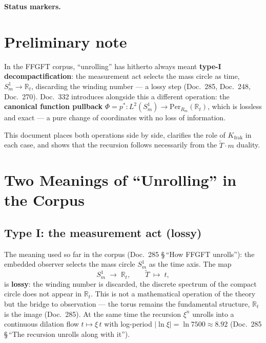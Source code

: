 
\medskip\noindent\textbf{Status markers.}


\section*{Preliminary note}

In the FFGFT corpus, ``unrolling'' has hitherto always meant
\textbf{type-I decompactification}: the measurement act selects the
mass circle as time, $S^1_m\to\mathbb{R}_t$, discarding the winding
number — a lossy step (Doc.~285, Doc.~248, Doc.~270).
Doc.~332 introduces alongside this a different operation: the
\textbf{canonical function pullback}
$\Phi=p^*:L^2(S^1_m)\to\mathrm{Per}_{R_m}(\mathbb{R}_t)$, which is
lossless and exact — a pure change of coordinates with no loss of
information.

This document places both operations side by side, clarifies the role
of $K_{\text{frak}}$ in each case, and shows that the recursion
follows necessarily from the $\tilde{T}\cdot m$ duality.

\section{Two Meanings of ``Unrolling'' in the Corpus}

\subsection{Type I: the measurement act (lossy)}

The meaning used so far in the corpus (Doc.~285 §\,``How FFGFT
unrolls''): the embedded observer selects the mass circle $S^1_m$ as
the time axis. The map
\[
  S^1_m \;\longrightarrow\; \mathbb{R}_t, \qquad
  \tilde T \;\mapsto\; t,
\]
is \textbf{lossy}: the winding number is discarded, the discrete
spectrum of the compact circle does not appear in $\mathbb{R}_t$.
This is not a mathematical operation of the theory but the bridge to
observation — the torus remains the fundamental structure,
$\mathbb{R}_t$ is the image (Doc.~285). At the same time the recursion
$\xi^n$ unrolls into a continuous dilation flow $t\mapsto\xi\,t$ with
log-period $|\ln\xi|=\ln 7500\approx 8.92$ (Doc.~285 §\,``The
recursion unrolls along with it'').

